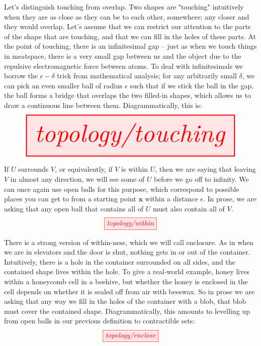 \begin{myboxR}
\begin{defn}[Touching]\label{defn:touching}
Let's distinguish touching from overlap. Two shapes are "touching" intuitively when they are as close as they can be to each other, somewhere; any closer and they would overlap. Let's assume that we can restrict our attention to the parts of the shape that are touching, and that we can fill in the holes of these parts. At the point of touching, there is an infinitesimal gap -- just as when we touch things in meatspace, there is a very small gap between us and the object due to the repulsive electromagnetic force between atoms. To deal with infinitesimals we borrow the $\epsilon-\delta$ trick from mathematical analysis; for any arbitrarily small $\delta$, we can pick an even smaller ball of radius $\epsilon$ such that if we stick the ball in the gap, the ball forms a bridge that overlaps the two filled-in shapes, which allows us to draw a continuous line between them. Diagrammatically, this is: 
\[\resizebox{\textwidth}{!}{\tikzfig{topology/touching}}\]
\end{defn}
\end{myboxR}

\begin{myboxB}
\begin{defn}\label{defn:within}
If $U$ surrounds $V$, or equivalently, if $V$ is within $U$, then we are saying that leaving $V$ in almost any direction, we will see some of $U$ before we go off to infinity. We can once again use open balls for this purpose, which correspond to possible places you can get to from a starting point $\mathbf{x}$ within a distance $\epsilon$. In prose, we are asking that any open ball that contains all of $U$ must also contain all of $V$.
\[\tikzfig{topology/within}\]
\end{defn}
\end{myboxB}

\begin{myboxR}
\begin{defn}\label{defn:containment}
There is a strong version of within-ness, which we will call enclosure. As in when we are in elevators and the door is shut, nothing gets in or out of the container. Intuitively, there is a hole in the container surrounded on all sides, and the contained shape lives within the hole. To give a real-world example, honey lives within a honeycomb cell in a beehive, but whether the honey is enclosed in the cell depends on whether it is sealed off from air with beeswax. So in prose we are asking that any way we fill in the holes of the container with a blob, that blob must cover the contained shape. Diagrammatically, this amounts to levelling up from open balls in our previous definition to contractible sets:
\[\tikzfig{topology/enclose}\]
\end{defn}
\end{myboxR}


